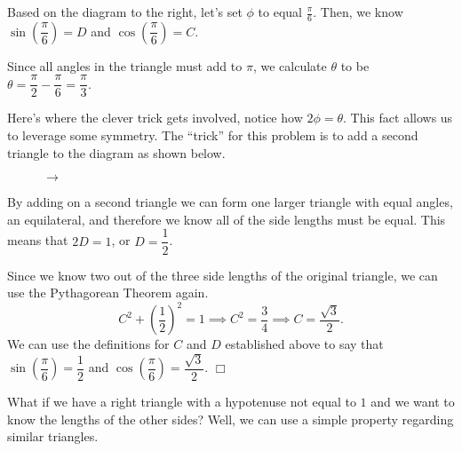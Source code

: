 \documentclass[lang=en,11pt]{elegantbook}
\begin{document}
\begin{solution}
Based on the diagram to the right, let's set $\phi$ to equal $\frac{\pi}{6}$. Then, we know $\sin\left(\dfrac{\pi}{6}\right)=D$ and $\cos\left(\dfrac{\pi}{6}\right)=C$.

Since all angles in the triangle must add to $\pi$, we calculate $\theta$ to be $\theta=\dfrac{\pi}{2}-\dfrac{\pi}{6}=\dfrac{\pi}{3}.$

Here’s where the clever trick gets involved, notice how $2\phi=\theta$. This fact allows us to leverage some symmetry. The “trick” for this problem is to add a second triangle to the diagram as shown below.
\begin{figure}[!h]
    \centering
     $\to$ 
\end{figure}

By adding on a second triangle we can form one larger triangle with equal angles, an equilateral, and therefore we know all of the side lengths must be equal. This means that $2D=1$, or $D=\dfrac{1}{2}$.

Since we know two out of the three side lengths of the original triangle, we can use the Pythagorean Theorem again. $$C^2+\left(\dfrac{1}{2}\right)^2=1 \implies C^2=\dfrac{3}{4} \implies C=\dfrac{\sqrt{3}}{2}.$$ We can use the definitions for $C$ and $D$ established above to say that $\sin\left(\dfrac{\pi}{6}\right)=\dfrac{1}{2}$ and $\cos\left(\dfrac{\pi}{6}\right)=\dfrac{\sqrt{3}}{2}$. $\Box$
\end{solution}
What if we have a right triangle with a hypotenuse not equal to $1$ and we want to know the lengths of the other sides? Well, we can use a simple property regarding similar triangles.
\end{document}
